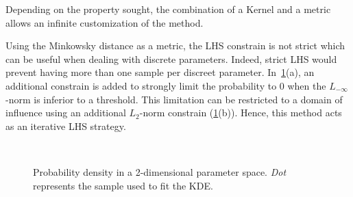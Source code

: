 Depending on the property sought, the combination of a Kernel and a metric allows an infinite customization of the method.

Using the Minkowsky distance as a metric, the LHS constrain is not strict which can be useful when dealing with discrete parameters. Indeed, strict LHS would prevent having more than one sample per discreet parameter. In~\cref{fig:lhs_const}(a), an additional constrain is added to strongly limit the probability to 0 when the $L_{-\infty}$-norm is inferior to a threshold. This limitation can be restricted to a domain of influence using an additional $L_2$-norm constrain (\cref{fig:lhs_const}(b)). Hence, this method acts as an iterative LHS strategy.

\begin{figure}[!ht]               
\centering
{}
~

\caption{Probability density in a 2-dimensional parameter space. \emph{Dot} represents the sample used to fit the KDE.}
 \label{fig:lhs_const}
\end{figure}



